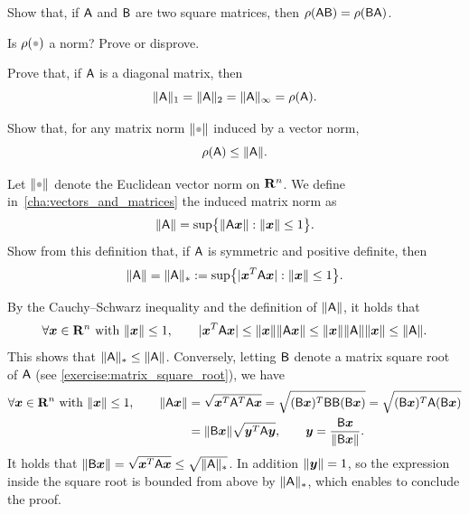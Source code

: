 \begin{exercise}
    Show that, if $\mathsf A$ and $\mathsf B$ are two square matrices,
    then $\rho(\mathsf A \mathsf B) = \rho(\mathsf B \mathsf A)$.
\end{exercise}

\begin{exercise}
    Is $\rho(\placeholder)$ a norm? Prove or disprove.
\end{exercise}

\begin{exercise}
    Prove that, if $\mathsf A$ is a diagonal matrix, then
    \[
        \lVert\mathsf A\rVert_1 = \lVert\mathsf A\rVert_2 = \lVert\mathsf A\rVert_{\infty} = \rho(\mathsf A).
    \]
\end{exercise}

\begin{exercise}
    Show that, for any matrix norm $\norm{\placeholder}$ induced by a vector norm,
    \[
        \rho(\mathsf A) \leq \lVert\mathsf A\rVert.
    \]
\end{exercise}

\begin{exercise}
    Let $\norm{\placeholder}$ denote the Euclidean vector norm on $\mathbf R^n$.
    We define in~\cref{cha:vectors_and_matrices} the induced matrix norm as
    \[
        \lVert\mathsf A\rVert = \sup \bigl\{ \lVert\mathsf A \mathbf{\boldsymbol{x}}\rVert: \lVert\mathbf{\boldsymbol{x}}\rVert \leq 1 \bigr\}.
    \]
    Show from this definition that, if $\mathsf A$ is symmetric and positive definite,
    then
    \[
        \lVert\mathsf A\rVert = \lVert\mathsf A\rVert_* := \sup \bigl\{ \lvert\mathbf{\boldsymbol{x}}^T \mathsf A \mathbf{\boldsymbol{x}}\rvert: \lVert\mathbf{\boldsymbol{x}}\rVert \leq 1 \bigr\}.
    \]
\end{exercise}
\begin{solution}
    By the Cauchy--Schwarz inequality and the definition of $\lVert\mathsf A\rVert$,
    it holds that
    \[
        \forall \mathbf{\boldsymbol{x}} \in \mathbf R^n \text{ with } \lVert\mathbf{\boldsymbol{x}}\rVert \leq 1, \qquad
         \lvert\mathbf{\boldsymbol{x}}^T \mathsf A \mathbf{\boldsymbol{x}}\rvert
         \leq \lVert\mathbf{\boldsymbol{x}}\rVert \lVert\mathsf A \mathbf{\boldsymbol{x}}\rVert
         \leq \lVert\mathbf{\boldsymbol{x}}\rVert \lVert\mathsf A\rVert \lVert\mathbf{\boldsymbol{x}}\rVert \leq \lVert\mathsf A\rVert.
    \]
    This shows that $\lVert\mathsf A\rVert_* \leq \lVert\mathsf A\rVert$.
    Conversely,
    letting $\mathsf B$ denote a matrix square root of $\mathsf A$ (see \cref{exercise:matrix_square_root}),
    we have
    \begin{align*}
        \forall \mathbf{\boldsymbol{x}} \in \mathbf R^n \text{ with } \lVert\mathbf{\boldsymbol{x}}\rVert \leq 1, \qquad
        \lVert\mathsf A \mathbf{\boldsymbol{x}}\rVert
        &= \sqrt{\mathbf{\boldsymbol{x}}^T \mathsf A^T \mathsf A \mathbf{\boldsymbol{x}}}
        = \sqrt{(\mathsf B\mathbf{\boldsymbol{x}})^T \mathsf B \mathsf B (\mathsf B\mathbf{\boldsymbol{x}})}
        = \sqrt{(\mathsf B\mathbf{\boldsymbol{x}})^T \mathsf A (\mathsf B\mathbf{\boldsymbol{x}})} \\
        &= \lVert\mathsf B \mathbf{\boldsymbol{x}}\rVert \sqrt{\mathbf{\boldsymbol{y}}^T \mathsf A \mathbf{\boldsymbol{y}}},
        \qquad \mathbf{\boldsymbol{y}} = \frac{\mathsf B \mathbf{\boldsymbol{x}}}{\lVert\mathsf B \mathbf{\boldsymbol{x}}\rVert}.
    \end{align*}
    It holds that $\lVert\mathsf B \mathbf{\boldsymbol{x}}\rVert = \sqrt{\mathbf{\boldsymbol{x}}^T \mathsf A \mathbf{\boldsymbol{x}}} \leq \sqrt{\lVert\mathsf A\rVert_*}$.
    In addition $\lVert\mathbf{\boldsymbol{y}}\rVert = 1$,
    so the expression inside the square root is bounded from above by $\lVert\mathsf A\rVert_*$,
    which enables to conclude the proof.
\end{solution}

